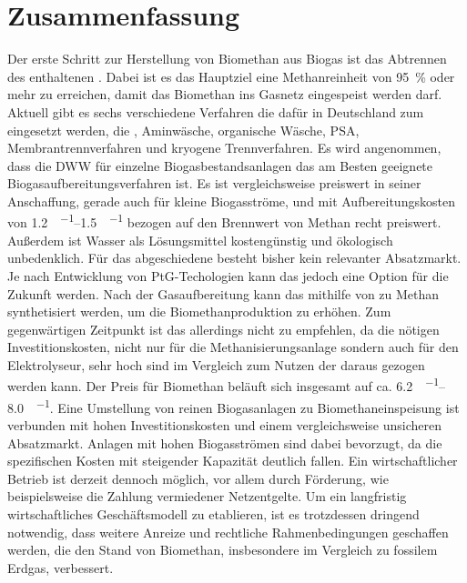 
\section{Zusammenfassung}\label{ch_sum}

Der erste Schritt zur Herstellung von Biomethan aus Biogas ist das Abtrennen des enthaltenen . Dabei ist es das Hauptziel eine Methanreinheit von \SI{95}{\percent} oder mehr zu erreichen, damit das Biomethan ins Gasnetz eingespeist werden darf. Aktuell gibt es sechs verschiedene Verfahren die dafür in Deutschland zum eingesetzt werden, die , Aminwäsche, organische Wäsche, \gls{PSA}, Membrantrennverfahren und kryogene Trennverfahren. Es wird angenommen, dass die \gls{DWW} für einzelne Biogasbestandsanlagen das am Besten geeignete Biogasaufbereitungsverfahren ist. Es ist vergleichsweise preiswert in seiner Anschaffung, gerade auch für kleine Biogasströme, und mit Aufbereitungskosten von \SIrange{1,2}{1,5}{\ct\per\kwh} bezogen auf den Brennwert von Methan recht preiswert. Außerdem ist Wasser als Lösungsmittel kostengünstig und ökologisch unbedenklich. Für das abgeschiedene  besteht bisher kein relevanter Absatzmarkt. Je nach Entwicklung von PtG-Techologien kann das jedoch eine Option für die Zukunft werden. \newline
Nach der Gasaufbereitung kann das  mithilfe von  zu Methan synthetisiert werden, um die Biomethanproduktion zu erhöhen. Zum gegenwärtigen Zeitpunkt ist das allerdings nicht zu empfehlen, da die nötigen Investitionskosten, nicht nur für die Methanisierungsanlage sondern auch für den Elektrolyseur, sehr hoch sind im Vergleich zum Nutzen der daraus gezogen werden kann. \newline
Der Preis für Biomethan beläuft sich insgesamt auf ca. \SIrange{6,2}{8,0}{\ct\per\kwh}. Eine Umstellung von reinen Biogasanlagen zu Biomethaneinspeisung ist verbunden mit hohen Investitionskosten und einem vergleichsweise unsicheren Absatzmarkt. Anlagen mit hohen Biogasströmen sind dabei bevorzugt, da die spezifischen Kosten mit steigender Kapazität deutlich fallen. Ein wirtschaftlicher Betrieb ist derzeit dennoch möglich, vor allem durch Förderung, wie beispielsweise die Zahlung vermiedener Netzentgelte. Um ein langfristig wirtschaftliches Geschäftsmodell zu etablieren, ist es trotzdessen dringend notwendig, dass weitere Anreize und rechtliche Rahmenbedingungen geschaffen werden, die den Stand von Biomethan, insbesondere im Vergleich zu fossilem Erdgas, verbessert.
